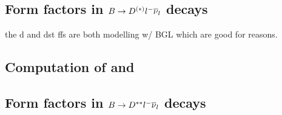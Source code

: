 \subsection{Form factors in $B \rightarrow D^{(*)}{l^-}{{\overline{\nu}}_l}$ decays}
\label{ref:theory:ff-d0-dst}

the d and dst ffs are both modelling w/ BGL which are good for reasons.


\subsection{Computation of \RD and \RDst}
\label{ref:theory:rdx}


\subsection{Form factors in $B \rightarrow D^{**}{l^-}{{\overline{\nu}}_l}$ decays}
\label{ref:theory:ff-dstst}
